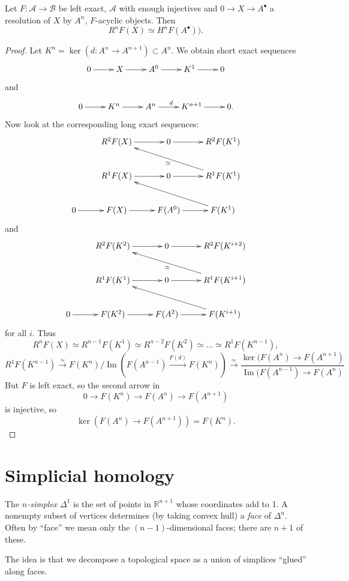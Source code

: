 \begin{proposition}[4.32, Voisin]
\label{proposition-432-acyclic}
Let $F:\mathcal{A} \to \mathcal{B}$
be left exact, $\mathcal{A}$ with enough
injectives and $0 \to X \to A^\bullet$
a resolution of $X$ by $A^n$,
$F$-acyclic objects. Then
$$
R^nF(X) \simeq H^nF(A^\bullet)).
$$
\end{proposition}

\begin{proof}
Let $K^n=\ker(d:A^n \to A^{n+1})
\subset A^n$.
We obtain short exact sequences
$$
\xymatrix{
0\ar[r]
&X\ar[r]
&A^0\ar[r]
&K^1\ar[r]
&0
}
$$
and
$$
\xymatrix{
0\ar[r]
&K^n\ar[r]
&A^n\ar[r]^d
&K^{n+1}\ar[r]
&0.
}
$$
Now look at the corresponding long
exact sequences:
$$
\xymatrix{
&R^2F(X)\ar[r]&0\ar[r]&R^2F(K^1)\\
&R^1F(X)\ar[r]&0\ar[r]&R^1F(K^1)
\ar[llu]^{\simeq}\\
0\ar[r]&F(X)\ar[r]&F(A^0)\ar[r]&F(K^1)
\ar[llu]
}
$$
and
$$
\xymatrix{
&R^2F(K^2)\ar[r]&0\ar[r]&R^2F(K^{i+2})\\
&R^1F(K^1)\ar[r]&0\ar[r]
&R^1F(K^{i+1})\ar[llu]^{\simeq}\\
0\ar[r]&F(K^2)\ar[r]&F(A^2)\ar[r]&
F(K^{i+1})\ar[ull]
}
$$
for all $i$.
Thus
$$
R^nF(X) \simeq R^{n-1}F(K^1)
\simeq R^{n-2}F(K^2) \simeq\dots
\simeq R^1F(K^{n-1}),
$$
$$
R^1F(K^{n-1}) \xrightarrow{\simeq}
F(K^n)/\operatorname{Im}(F(A^{n-1})
\xrightarrow{F(d)}F(K^n))
\xrightarrow{\simeq}
\frac{\ker(F(A^n) \to F(A^{n+1})}{
\operatorname{Im}(F(A^{n-1}) \to
F(A^n)}
$$
But $F$ is left exact, so the second arrow
in
$$
0 \to F(K^n) \to F(A^n) \to F(A^{n+1})
$$
is injective, so
$$
\ker(F(A^n)\to F(A^{n+1}))=F(K^n).
$$
\end{proof}

\section{Simplicial homology}
\label{section-simplicial-homology}

\begin{definition}
\label{definition-n-simplex}
The {\it $n$-simplex} $\Delta^1$ is the set
of points in $\mathbb{R}^{n+1}$ whose
coordinates add to 1.
A nonempty subset of vertices determines
(by taking convex hull) a {\it face} 
of $\Delta^n$. Often by ``face''
we mean only the $(n-1)$-dimensional
faces; there are $n+1$ of these.
\end{definition}

\noindent
The idea is that we decompose a topological
space as a union of simplices ``glued''
along faces.

